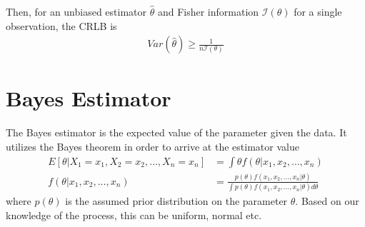 \documentclass[../probability-notes.tex]{subfiles}
\begin{document}
    Then, for an unbiased estimator $\hat{\theta}$ and Fisher information $\mathcal{I}(\theta)$ for a single observation, the CRLB is
    \begin{align*}
        Var(\hat{\theta}) \geq \frac{1}{n\mathcal{I}(\theta)}
    \end{align*}

    \section{Bayes Estimator}
    The Bayes estimator is the expected value of the parameter given the data. It utilizes the Bayes theorem in order to arrive at the estimator value
    \begin{align*}
        E[\theta|X_{1} = x_{1}, X_{2} = x_{2}, \ldots, X_{n} = x_{n}] &= \int \theta f(\theta|x_{1}, x_{2}, \ldots, x_{n})\\
        f(\theta|x_{1}, x_{2}, \ldots, x_{n}) &= \frac{p(\theta) f(x_{1}, x_{2}, \ldots, x_{n} | \theta)}{\int p(\theta) f(x_{1}, x_{2}, \ldots, x_{n} | \theta) d\theta}
    \end{align*}
    where $p(\theta)$ is the assumed prior distribution on the parameter $\theta$. Based on our knowledge of the process, this can be uniform, normal etc.
\end{document}
